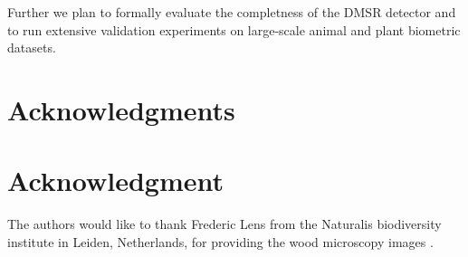 \documentclass[conference,compsoc]{IEEEtran}
\begin{document}
Further we plan to formally evaluate the completness of the DMSR detector and to run extensive validation experiments on large-scale animal and plant biometric datasets.

\ifCLASSOPTIONcompsoc
  \section*{Acknowledgments}
\else
  \section*{Acknowledgment}
\fi
The authors would like to thank Frederic Lens from the Naturalis biodiversity institute in Leiden, Netherlands, for providing the wood microscopy images \cite{wood}.



%
%
%





\end{document}
